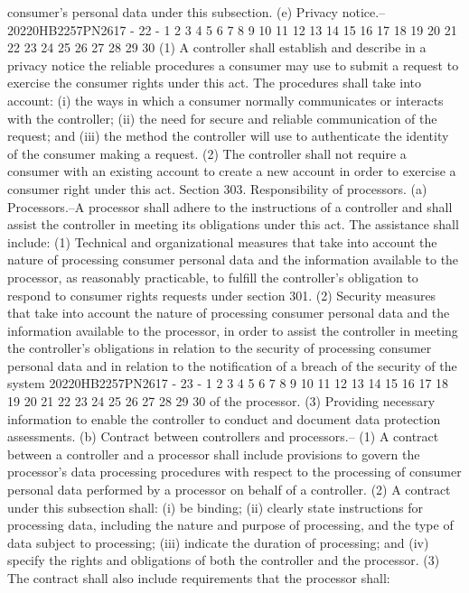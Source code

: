 consumer's personal data under this subsection.
(e) Privacy notice.--
20220HB2257PN2617 - 22 -
1
2
3
4
5
6
7
8
9
10
11
12
13
14
15
16
17
18
19
20
21
22
23
24
25
26
27
28
29
30
(1) A controller shall establish and describe in a
privacy notice the reliable procedures a consumer may use to
submit a request to exercise the consumer rights under this
act. The procedures shall take into account:
(i) the ways in which a consumer normally
communicates or interacts with the controller;
(ii) the need for secure and reliable communication
of the request; and
(iii) the method the controller will use to
authenticate the identity of the consumer making a
request.
(2) The controller shall not require a consumer with an
existing account to create a new account in order to exercise
a consumer right under this act.
Section 303. Responsibility of processors.
(a) Processors.--A processor shall adhere to the
instructions of a controller and shall assist the controller in
meeting its obligations under this act. The assistance shall
include:
(1) Technical and organizational measures that take into
account the nature of processing consumer personal data and
the information available to the processor, as reasonably
practicable, to fulfill the controller's obligation to
respond to consumer rights requests under section 301.
(2) Security measures that take into account the nature
of processing consumer personal data and the information
available to the processor, in order to assist the controller
in meeting the controller's obligations in relation to the
security of processing consumer personal data and in relation
to the notification of a breach of the security of the system
20220HB2257PN2617 - 23 -
1
2
3
4
5
6
7
8
9
10
11
12
13
14
15
16
17
18
19
20
21
22
23
24
25
26
27
28
29
30
of the processor.
(3) Providing necessary information to enable the
controller to conduct and document data protection
assessments.
(b) Contract between controllers and processors.--
(1) A contract between a controller and a processor
shall include provisions to govern the processor's data
processing procedures with respect to the processing of
consumer personal data performed by a processor on behalf of
a controller.
(2) A contract under this subsection shall:
(i) be binding;
(ii) clearly state instructions for processing data,
including the nature and purpose of processing, and the
type of data subject to processing;
(iii) indicate the duration of processing; and
(iv) specify the rights and obligations of both the
controller and the processor.
(3) The contract shall also include requirements that
the processor shall:
